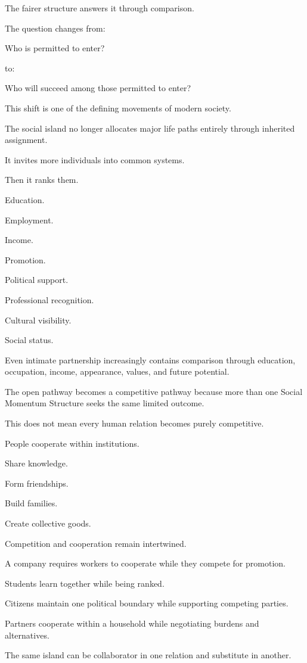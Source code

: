 The fairer structure answers it through comparison.

The question changes from:

Who is permitted to enter?

to:

Who will succeed among those permitted to enter?

This shift is one of the defining movements of modern society.

The social island no longer allocates major life paths entirely through inherited assignment.

It invites more individuals into common systems.

Then it ranks them.

Education.

Employment.

Income.

Promotion.

Political support.

Professional recognition.

Cultural visibility.

Social status.

Even intimate partnership increasingly contains comparison through education, occupation, income, appearance, values, and future potential.

The open pathway becomes a competitive pathway because more than one Social Momentum Structure seeks the same limited outcome.

This does not mean every human relation becomes purely competitive.

People cooperate within institutions.

Share knowledge.

Form friendships.

Build families.

Create collective goods.

Competition and cooperation remain intertwined.

A company requires workers to cooperate while they compete for promotion.

Students learn together while being ranked.

Citizens maintain one political boundary while supporting competing parties.

Partners cooperate within a household while negotiating burdens and alternatives.

The same island can be collaborator in one relation and substitute in another.

